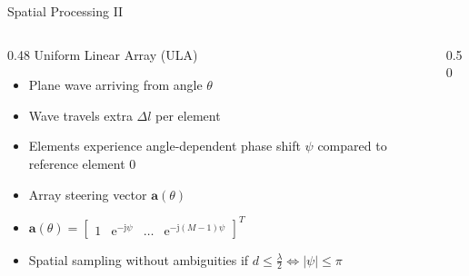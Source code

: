 \begin{frame}{Spatial Processing II}
    \begin{columns}[onlytextwidth]
        \begin{column}{0.48\textwidth}
            Uniform Linear Array (ULA)
            \begin{itemize}
                \item Plane wave arriving from angle $\theta$
                \item Wave travels extra $\Delta l$ per element
                \item Elements experience angle-dependent phase shift $\psi$ compared to reference element 0
                \item Array steering vector $\mathbf{a}(\theta)$
                \item $\mathbf{a}(\theta) = \begin{bmatrix} 1 & \mathrm{e}^{-\mathrm{j}\psi} & \dots & \mathrm{e}^{-\mathrm{j}(M-1)\psi} \end{bmatrix}^T$
                \item Spatial sampling without ambiguities if $d \le \frac{\lambda}{2} \iff |\psi| \le \pi$
            \end{itemize}
        \end{column}

        \begin{column}{0.50\textwidth}
            \centering
\end{column}
\end{columns}
\end{frame}
